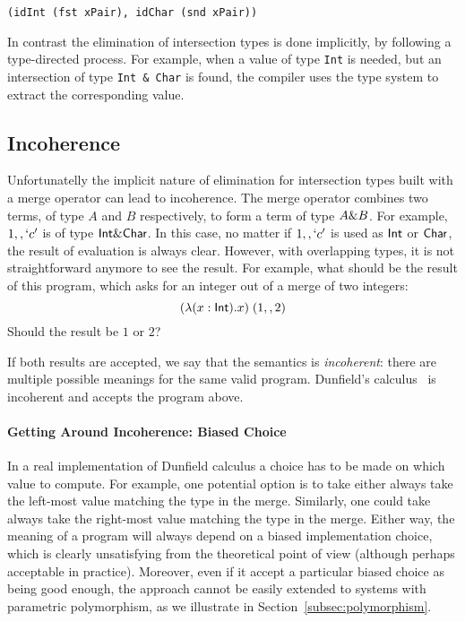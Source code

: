 \begin{lstlisting}
(idInt (fst xPair), idChar (snd xPair))
\end{lstlisting}

\noindent In contrast the elimination of intersection types is done
implicitly, by following a type-directed process. For example,
when a value of type \lstinline{Int} is needed, but an intersection
of type \lstinline{Int & Char} is found, the compiler uses the
type system to extract the corresponding value.

\subsection{Incoherence}\label{subsec:incoherence}
Unfortunatelly the implicit nature of elimination for intersection
types built with a merge operator can lead to incoherence.
The merge operator combines two terms, of type $A$ and $B$
respectively, to form a term of type $A \& B$. For example,
$1 ,, `c'$ is of type $\textsf{Int} \& \textsf{Char}$. In this case, no
matter if $1 ,, `c'$ is used as $\textsf{Int}$ or $\textsf{Char}$, the result
of evaluation is always clear. However, with overlapping types, it is
not straightforward anymore to see the result. For example, what
should be the result of this program, which asks for an integer out of
a merge of two integers:
\[ (\lambda (x : \textsf{Int}). x) \; (1 ,, 2) \]
Should the result be $1$ or $2$?

If both results are accepted, we say that the semantics is
\emph{incoherent}: there are multiple possible meanings for the same
valid program. Dunfield's calculus~\cite{dunfield2014elaborating} is incoherent and accepts the
program above.

\paragraph{Getting Around Incoherence: Biased Choice}
In a real implementation of Dunfield calculus a choice has to be made
on which value to compute. For example, one potential option is to
take either always take the left-most value matching the type in the
merge. Similarly, one could take always take the right-most
value matching the type in the merge. Either way, the meaning
of a program will always depend on a biased implementation choice, 
which is clearly unsatisfying from the theoretical point of view
(although perhaps acceptable in practice).
Moreover, even if it accept a particular biased choice as
being good enough, the approach cannot be easily
extended to systems with parametric polymorphism, as we illustrate 
in Section~\ref{subsec:polymorphism}.

